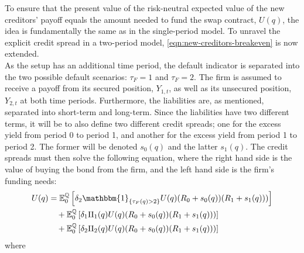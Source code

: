 \documentclass[main.tex]{subfiles}
\begin{document}
        To ensure that the present value of the risk-neutral expected value of the new creditors' payoff equals the amount needed to fund the swap contract, $U(q)$,
        the idea is fundamentally the same as in the single-period model.
        To unravel the explicit credit spread in a two-period model,
        \cref{eqn:new-creditors-breakeven} is now extended.
        \\
        As the setup has an additional time period, the default indicator is separated into the two possible default scenarios:
        $\tau_F = 1$ and $\tau_F = 2$.
        The firm is assumed to receive a payoff from its secured position, $Y_{1,t}$, as well as its unsecured position, $Y_{2,t}$ at both time periods.
        Furthermore, the liabilities are, as mentioned, separated into short-term and long-term.
        Since the liabilities have two different terms, 
        it will be to also define two different credit spreads;
        one for the excess yield from period 0 to period 1,
        and another for the excess yield from period 1 to period 2.
        The former will be denoted $s_{0}(q)$ and the latter $s_{1}(q)$.
        The credit spreads must then solve the following equation,
        where the right hand side is the value of buying the bond from the firm,
        and the left hand side is the firm's funding needs:
        \begin{align}
            U(q)
            &=
                \mathbb{E}_{0}^{\rnmeasure}\left[
                    \delta_2
                    \mathbbm{1}_{\{\tau_{F}(q)>2\}}
                    U(q)
                    (R_{0} + s_{0}(q))(R_{1} + s_{1}(q)))
                \right]
            \nonumber
            \\
            &\quad+ \mathbb{E}_{0}^{\rnmeasure}
            \left[
                \delta_1 \Pi_1(q) U(q)(R_{0} + s_{0}(q))(R_{1} + s_{1}(q)))
            \right]
            \nonumber
            \\
            &\quad+ \mathbb{E}_{0}^{\rnmeasure}
            \left[
                \delta_2\Pi_2(q) U(q)(R_{0} + s_{0}(q))(R_{1} + s_{1}(q)))
            \right]
            \label{eqn:new-creditors-breakeven-two-period-model}
        \end{align}
        where
\end{document}
